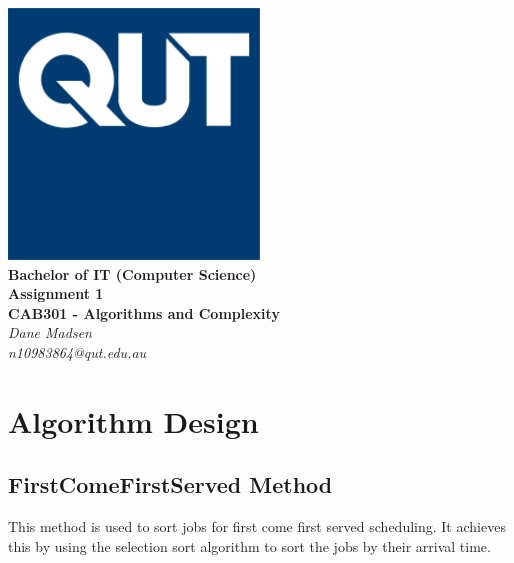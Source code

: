 \documentclass[12pt,a4paper]{article}
\begin{document}
	\begin{titlepage}
		
		\begin{center}
			\includegraphics[width=0.5\textwidth]{QUT.jpg}\\
			[0.03\textheight]  
			\Large\textbf{Bachelor of IT (Computer Science)}\\
			\Large\textbf{Assignment 1}\\
			\large\textbf{CAB301 - Algorithms and Complexity}\\
			[0.02\textheight]
			\large\textsl{Dane Madsen}\\
			\large\textsl{n10983864@qut.edu.au}
		\end{center}
		
	\end{titlepage}
	\tableofcontents
	\newpage
	
	\section{Algorithm Design}
		\subsection{FirstComeFirstServed Method}
			This method is used to sort jobs for first come first served scheduling. It achieves 
			this by using the selection sort algorithm to sort the jobs by their arrival time.\\
		
\end{document}
